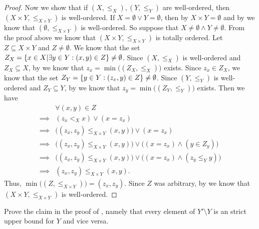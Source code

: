 \begin{proof}
  Now we show that if \((X, \leq_X), (Y, \leq_Y)\) are well-ordered, then \((X \times Y, \leq_{X \times Y})\) is well-ordered.
  If \(X = \emptyset \lor Y = \emptyset\), then by  \(X \times Y = \emptyset\) and by  we know that \((\emptyset, \leq_{X \times Y})\) is well-ordered.
  So suppose that \(X \neq \emptyset \land Y \neq \emptyset\).
  From the proof above we know that \((X \times Y, \leq_{X \times Y})\) is totally ordered.
  Let \(Z \subseteq X \times Y\) and \(Z \neq \emptyset\).
  We know that the set \(Z_X = \left\lbrace x \in X | \exists y \in Y : (x, y) \in Z\right\rbrace \neq \emptyset\).
  Since \((X, \leq_X)\) is well-ordered and \(Z_X \subseteq X\), by  we know that \(z_x = \min\big((Z_X, \leq_X)\big)\) exists.
  Since \(z_x \in Z_X\), we know that the set \(Z_Y = \left\lbrace y \in Y : (z_x, y) \in Z\right\rbrace \neq \emptyset\).
  Since \((Y, \leq_Y)\) is well-ordered and \(Z_Y \subseteq Y\), by  we know that \(z_y = \min\big((Z_Y, \leq_Y)\big)\) exists.
  Then we have
  \begin{align*}
             & \forall (x, y) \in Z                                                                        \\
    \implies & (z_x <_X x) \lor (x = z_x)                                                                  \\
    \implies & \big((z_x, z_y) \leq_{X \times Y} (x, y)\big) \lor (x = z_x)                                \\
    \implies & \big((z_x, z_y) \leq_{X \times Y} (x, y)\big) \lor \big((x = z_x) \land (y \in Z_y)\big)    \\
    \implies & \big((z_x, z_y) \leq_{X \times Y} (x, y)\big) \lor \big((x = z_x) \land (z_y \leq_Y y)\big) \\
    \implies & (z_x, z_y) \leq_{X \times Y} (x, y).
  \end{align*}
  Thus, \(\min\big((Z, \leq_{X \times Y})\big) = (z_x, z_y)\).
  Since \(Z\) was arbitrary, by  we know that \((X \times Y, \leq_{X \times Y})\) is well-ordered.
\end{proof}

\begin{ex}\label{i:ex:8.5.13}
  Prove the claim in the proof of , namely that every element of \(Y' \setminus Y\) is an strict upper bound for \(Y\) and vice versa.
\end{ex}

